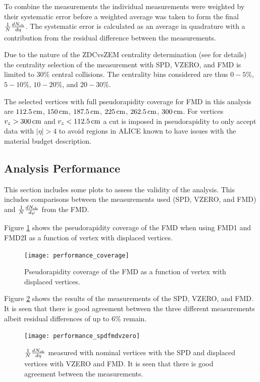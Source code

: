 \documentclass[11pt]{article}
\begin{document}
To combine the measurements the individual measurements were weighted
by their systematic error before a weighted average was taken to form
the final $\dndeta$. The systematic error is calculated as an average
in quadrature with a contribution from the residual difference between
the measurements.

Due to the nature of the ZDCvsZEM centrality determination (see
\cite{maxime} for details) the centrality selection of the measurement
with SPD, VZERO, and FMD is limited to $30\%$ central collisions. The
centrality bins considered are thus $0-5\%$, $5-10\%$, $10-20\%$, and
$20-30\%$.

The selected vertices with full pseudorapidity coverage for FMD in
this analysis are $\cm{112.5}$, $\cm{150}$, $\cm{187.5}$, $\cm{225}$,
$\cm{262.5}$, $\cm{300}$. For vertices $v_z > \cm{300}$ and $v_z <
\cm{112.5}$ a cut is imposed in pseudorapidity to only accept data
with $|\eta| > 4$ to avoid regions in ALICE known to have issues with
the material budget description.

\subsection{Analysis Performance}

This section includes some plots to assess the validity of the
analysis. This includes comparisons between the measurements used
(SPD, VZERO, and FMD) and $\dndphi$ from the FMD.

Figure \ref{coverage} shows the pseudorapidity coverage of the FMD
when using FMD1 and FMD2I as a function of vertex with displaced
vertices.
\begin{figure}[hbp]
  \centering
  \texttt{[image: performance\_coverage]}
  \caption{Pseudorapidity coverage of the FMD as a function of vertex
    with displaced vertices.}
  \label{coverage}
\end{figure} 

Figure \ref{spdfmdvzero} shows the results of the measurements of the
SPD, VZERO, and FMD. It is seen that there is good agreement between
the three different measurements albeit residual differences of up to
$6 \%$ remain.
\begin{figure}[hbp]
   \centering
  \texttt{[image: performance\_spdfmdvzero]}
  \caption{$\dndeta$ measured with nominal vertices with the SPD and
    displaced vertices with VZERO and FMD. It is seen that there is
    good agreement between the measurements.}
  \label{spdfmdvzero}
\end{figure} 
\end{document}
